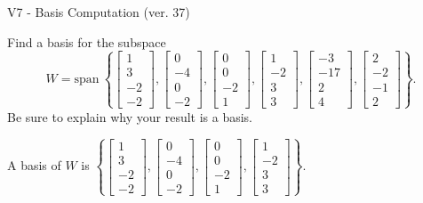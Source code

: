 \begin{exercise}
  \begin{exerciseTitle}V7 - Basis Computation (ver. 37)\end{exerciseTitle}
  \begin{exerciseStatement}
    Find a basis for the subspace 
\[W=\mathrm{span}\ \left\{\left[\begin{array}{r}
1 \\
3 \\
-2 \\
-2
\end{array}\right] , \left[\begin{array}{r}
0 \\
-4 \\
0 \\
-2
\end{array}\right] , \left[\begin{array}{r}
0 \\
0 \\
-2 \\
1
\end{array}\right] , \left[\begin{array}{r}
1 \\
-2 \\
3 \\
3
\end{array}\right] , \left[\begin{array}{r}
-3 \\
-17 \\
2 \\
4
\end{array}\right] , \left[\begin{array}{r}
2 \\
-2 \\
-1 \\
2
\end{array}\right]\right\}.\]
 Be sure to explain why your result is a basis.


  \end{exerciseStatement}
  \begin{exerciseAnswer}
   A basis of \(W\) is  \(\left\{\left[\begin{array}{r}
1 \\
3 \\
-2 \\
-2
\end{array}\right] , \left[\begin{array}{r}
0 \\
-4 \\
0 \\
-2
\end{array}\right] , \left[\begin{array}{r}
0 \\
0 \\
-2 \\
1
\end{array}\right] , \left[\begin{array}{r}
1 \\
-2 \\
3 \\
3
\end{array}\right]\right\}\).
  


  \end{exerciseAnswer}
\end{exercise}